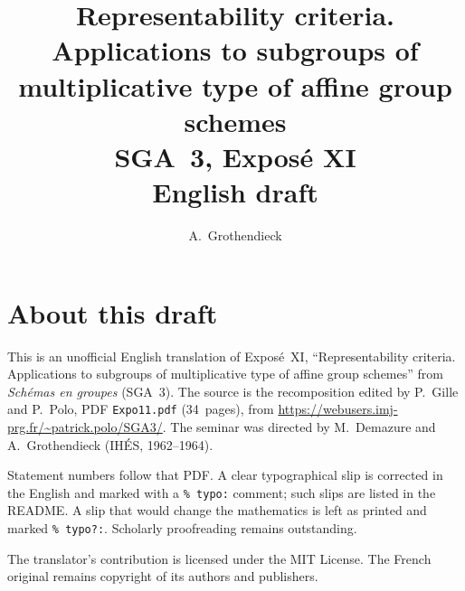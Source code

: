 \documentclass[11pt,a4paper,oneside]{amsbook}
\title[SGA~3, Expos\'e XI (English draft)]{Representability criteria. Applications to subgroups of multiplicative type of affine group schemes\\
{\normalsize SGA~3, Expos\'e XI\\English draft}}
\author{A.\ Grothendieck}
\date{}
\begin{document}
\frontmatter
\maketitle

\chapter*{About this draft}
This is an unofficial English translation of Expos\'e~XI, ``Representability criteria. Applications to subgroups of multiplicative type of affine group schemes''
from \textit{Sch\'emas en groupes} (SGA~3).
The source is the recomposition edited by P.~Gille and P.~Polo,
PDF \texttt{Expo11.pdf} (34~pages),
from \url{https://webusers.imj-prg.fr/~patrick.polo/SGA3/}.
The seminar was directed by M.~Demazure and A.~Grothendieck
(IH\'ES, 1962--1964).

Statement numbers follow that PDF. A clear typographical slip is
corrected in the English and marked with a \texttt{\% typo:} comment;
such slips are listed in the README. A slip that would change the
mathematics is left as printed and marked \texttt{\% typo?:}.
Scholarly proofreading remains outstanding.

The translator's contribution is licensed under the MIT License.
The French original remains copyright of its authors and publishers.

\tableofcontents
\mainmatter






\end{document}
